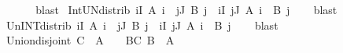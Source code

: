 \begin{isabellebody}
\ \ %
\isanewline
%
\isadelimproof
\ \ %
\endisadelimproof
%
\isatagproof
{}\isamarkupfalse%
\ blast%
\endisatagproof
{\isafoldproof}%
%
\isadelimproof
\isanewline
%
\endisadelimproof
\isanewline
{}\isamarkupfalse%
\ Int{\isacharunderscore}{\kern0pt}UN{\isacharunderscore}{\kern0pt}distrib{}{\isacharcolon}{\kern0pt}\ {\isachardoublequoteopen}{\isacharparenleft}{\kern0pt}{\isasymUnion}i{\isasymin}I{\isachardot}{\kern0pt}\ A\ i{\isacharparenright}{\kern0pt}\ {\isasyminter}\ {\isacharparenleft}{\kern0pt}{\isasymUnion}j{\isasymin}J{\isachardot}{\kern0pt}\ B\ j{\isacharparenright}{\kern0pt}\ {\isacharequal}{\kern0pt}\ {\isacharparenleft}{\kern0pt}{\isasymUnion}i{\isasymin}I{\isachardot}{\kern0pt}\ {\isasymUnion}j{\isasymin}J{\isachardot}{\kern0pt}\ A\ i\ {\isasyminter}\ B\ j{\isacharparenright}{\kern0pt}{\isachardoublequoteclose}\isanewline
%
\isadelimproof
\ \ %
\endisadelimproof
%
\isatagproof
{}\isamarkupfalse%
\ blast%
\endisatagproof
{\isafoldproof}%
%
\isadelimproof
\isanewline
%
\endisadelimproof
\isanewline
{}\isamarkupfalse%
\ Un{\isacharunderscore}{\kern0pt}INT{\isacharunderscore}{\kern0pt}distrib{}{\isacharcolon}{\kern0pt}\ {\isachardoublequoteopen}{\isacharparenleft}{\kern0pt}{\isasymInter}i{\isasymin}I{\isachardot}{\kern0pt}\ A\ i{\isacharparenright}{\kern0pt}\ {\isasymunion}\ {\isacharparenleft}{\kern0pt}{\isasymInter}j{\isasymin}J{\isachardot}{\kern0pt}\ B\ j{\isacharparenright}{\kern0pt}\ {\isacharequal}{\kern0pt}\ {\isacharparenleft}{\kern0pt}{\isasymInter}i{\isasymin}I{\isachardot}{\kern0pt}\ {\isasymInter}j{\isasymin}J{\isachardot}{\kern0pt}\ A\ i\ {\isasymunion}\ B\ j{\isacharparenright}{\kern0pt}{\isachardoublequoteclose}\isanewline
%
\isadelimproof
\ \ %
\endisadelimproof
%
\isatagproof
{}\isamarkupfalse%
\ blast%
\endisatagproof
{\isafoldproof}%
%
\isadelimproof
\isanewline
%
\endisadelimproof
\isanewline
{}\isamarkupfalse%
\ Union{\isacharunderscore}{\kern0pt}disjoint{\isacharcolon}{\kern0pt}\ {\isachardoublequoteopen}{\isacharparenleft}{\kern0pt}{\isasymUnion}C\ {\isasyminter}\ A\ {\isacharequal}{\kern0pt}\ {\isacharbraceleft}{\kern0pt}{\isacharbraceright}{\kern0pt}{\isacharparenright}{\kern0pt}\ {\isasymlongleftrightarrow}\ {\isacharparenleft}{\kern0pt}{\isasymforall}B{\isasymin}C{\isachardot}{\kern0pt}\ B\ {\isasyminter}\ A\ {\isacharequal}{\kern0pt}\ {\isacharbraceleft}{\kern0pt}{\isacharbraceright}{\kern0pt}{\isacharparenright}{\kern0pt}{\isachardoublequoteclose}\isanewline

\end{isabellebody}
